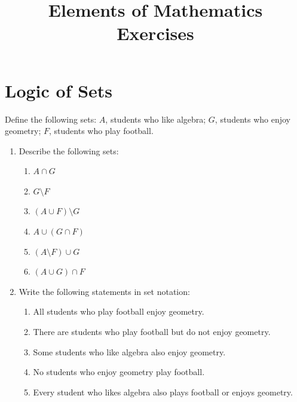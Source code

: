 \documentclass{article}
\title{Elements of Mathematics \\ Exercises}
\author{}
\date{}
\begin{document}
\maketitle
\vspace{-1.5cm}

\section{Logic of Sets}

Define the following sets: $A$, students who like algebra; $G$, students who enjoy geometry; $F$, students who play football. 

\begin{enumerate}
    \item Describe the following sets:
    \begin{enumerate}[leftmargin = 0.5cm, label = (\alph*), rightmargin = 0.2cm]
        \item \( A \cap G \)
        \item \( G \setminus F \)
        \item \( (A \cup F) \setminus G \)
        \item \( A \cup (G \cap F) \) %
        \item \( (A \setminus F) \cup G \) %
        \item \( (A \cup G) \cap F \) %
    \end{enumerate}
    \item Write the following statements in set notation:
    \begin{enumerate}[leftmargin = 0.5cm, label = (\alph*), rightmargin = 0.2cm]
    \item All students who play football enjoy geometry. %

    \item There are students who play football but do not enjoy geometry.

    \item Some students who like algebra also enjoy geometry.

    \item No students who enjoy geometry play football.

    \item Every student who likes algebra also plays football or enjoys geometry.
    
\end{enumerate}
    
\end{enumerate}
\end{document}
